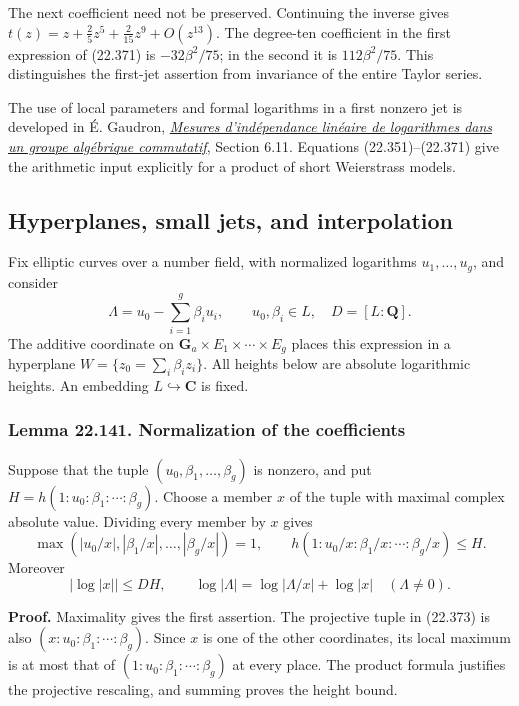 \documentclass[
  11pt,
  a4paper,
]{article}
\begin{document}
The next coefficient need not be preserved. Continuing the inverse gives
\(t(z)=z+\tfrac25z^5+\tfrac{2}{15}z^9+O(z^{13})\). The degree-ten
coefficient in the first expression of (22.371) is \(-32\beta^2/75\); in
the second it is \(112\beta^2/75\). This distinguishes the first-jet
assertion from invariance of the entire Taylor series.

The use of local parameters and formal logarithms in a first nonzero jet
is developed in É. Gaudron,
\href{https://lmbp.uca.fr/~gaudron/art4.pdf}{\emph{Mesures
d'indépendance linéaire de logarithmes dans un groupe algébrique
commutatif}}, Section 6.11. Equations (22.351)--(22.371) give the
arithmetic input explicitly for a product of short Weierstrass models.

\subsection{Hyperplanes, small jets, and
interpolation}\label{hyperplanes-small-jets-and-interpolation}

Fix elliptic curves over a number field, with normalized logarithms
\(u_1,\ldots,u_g\), and consider \[
 \Lambda=u_0-\sum_{i=1}^g\beta_i u_i,\qquad
 u_0,\beta_i\in L,\quad D=[L:\mathbf Q].
 \tag{22.372}
\] The additive coordinate on
\(\mathbf G_a\times E_1\times\cdots\times E_g\) places this expression
in a hyperplane \(W=\{z_0=\sum_i\beta_i z_i\}\). All heights below are
absolute logarithmic heights. An embedding \(L\hookrightarrow\mathbf C\)
is fixed.

\subsubsection{Lemma 22.141. Normalization of the
coefficients}\label{lemma-22.141.-normalization-of-the-coefficients}

Suppose that the tuple \((u_0,\beta_1,\ldots,\beta_g)\) is nonzero, and
put \(H=h(1:u_0:\beta_1:\cdots:\beta_g)\). Choose a member \(x\) of the
tuple with maximal complex absolute value. Dividing every member by
\(x\) gives \[
 \max(|u_0/x|,|\beta_1/x|,\ldots,|\beta_g/x|)=1,
 \qquad
 h(1 : u_0/x : \beta_1/x : \cdots : \beta_g/x)\le H.
 \tag{22.373}
\] Moreover \[
 |\log|x||\le DH,\qquad
 \log|\Lambda|=\log|\Lambda/x|+\log|x|
 \quad(\Lambda\ne0).
 \tag{22.374}
\]

\textbf{Proof.} Maximality gives the first assertion. The projective
tuple in (22.373) is also \((x:u_0:\beta_1:\cdots:\beta_g)\). Since
\(x\) is one of the other coordinates, its local maximum is at most that
of \((1:u_0:\beta_1:\cdots:\beta_g)\) at every place. The product
formula justifies the projective rescaling, and summing proves the
height bound.
\end{document}
